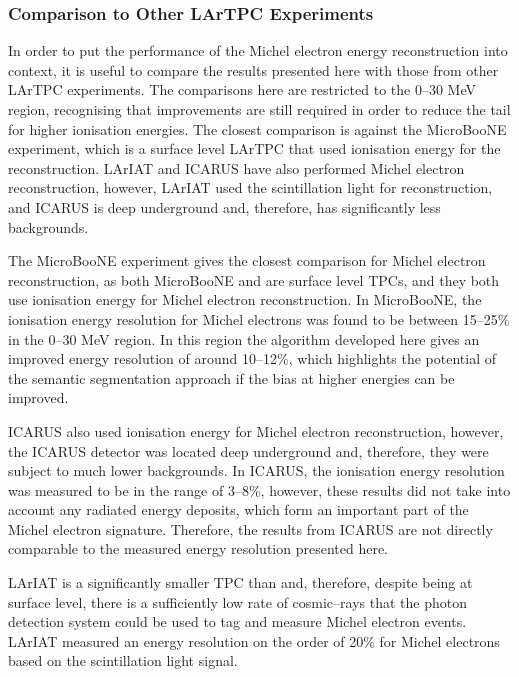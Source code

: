 \subsubsection*{Comparison to Other LArTPC Experiments} \label{ME_COMP}

In order to put the performance of the Michel electron energy
reconstruction into context, it is useful to compare the results presented
here with those from other LArTPC experiments. The comparisons here are
restricted to the 0--30 MeV region, recognising that improvements are still 
required in order to reduce the tail for higher ionisation energies. The closest
comparison is against the MicroBooNE experiment, which is a surface level LArTPC
that used ionisation energy for the reconstruction\cite{Acciarri:2017sjy}. 
LArIAT and ICARUS have also performed Michel electron 
reconstruction\cite{Amoruso:2003sw,Foreman_2016}, however, LArIAT used the 
scintillation light for reconstruction, and ICARUS is deep underground and, 
therefore, has significantly less backgrounds.

The MicroBooNE experiment gives the closest comparison for Michel electron
reconstruction, as both MicroBooNE and \protodune{} are surface level TPCs, and
they both use ionisation energy for Michel electron reconstruction. In
MicroBooNE, the ionisation energy resolution for Michel electrons was found to
be between 15--25\% in the 0--30 MeV region\cite{Acciarri:2017sjy}. In this 
region the algorithm developed here gives an improved energy resolution of 
around 10--12\%, which highlights the potential of the semantic segmentation 
approach if the bias at higher energies can be improved.

ICARUS also used ionisation energy for Michel electron reconstruction, however,
the ICARUS detector was located deep underground and, therefore, they were
subject to much lower backgrounds. In ICARUS, the ionisation energy resolution
was measured to be in the range of 3--8\%\cite{Amoruso:2003sw}, however, these
results did not take into account any radiated energy deposits, which form an
important part of the Michel electron signature. Therefore, the results from
ICARUS are not directly comparable to the measured energy resolution presented
here.

LArIAT is a significantly smaller TPC than \protodune{} and, therefore, despite
being at surface level, there is a sufficiently low rate of cosmic--rays that the
photon detection system could be used to tag and measure Michel electron events.
LArIAT measured an energy resolution on the order of 20\% for Michel electrons
based on the scintillation light signal\cite{Foreman_2016}.

